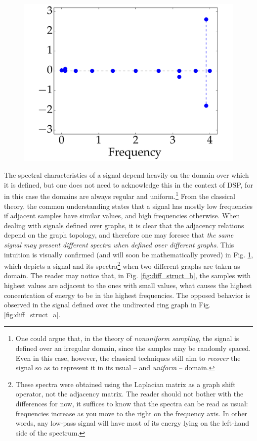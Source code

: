 \begin{figure}
\begin{minipage}[c]{0.25\linewidth}
{			\includegraphics[width=\linewidth]{Figures/ring_different_structure_02_spectrum_EN.pdf}
		}
	\end{minipage}%
	\floatsource
	\label{fig:diff_struct}%
	\vspace{-0.2cm}
\end{figure}

The spectral characteristics of a signal depend heavily on the domain over which it is defined, but one does not need to acknowledge this in the context of DSP, for in this case the domains are always regular and uniform.\footnote{One could argue that, in the theory of \emph{nonuniform sampling}, the signal is defined over an irregular domain, since the samples may be randomly spaced. Even in this case, however, the classical techniques still aim to \emph{recover} the signal so as to represent it in its usual -- and \emph{uniform} -- domain.
}
From the classical theory, the common understanding states that a signal has mostly low frequencies if adjacent samples have similar values, and high frequencies otherwise. When dealing with signals defined over graphs, it is clear that the adjacency relations depend on the graph topology, and therefore one may foresee that \emph{the same signal may present different spectra when defined over different graphs}. This intuition is visually confirmed (and will soon be mathematically proved) in Fig. \ref{fig:diff_struct}, which depicts a signal and its spectra\footnote{These spectra were obtained using the Laplacian matrix as a graph shift operator, not the adjacency matrix. The reader should not bother with the differences for now, it suffices to know that the spectra can be read as usual: frequencies increase as you move to the right on the frequency axis. In other words, any low-pass signal will have most of its energy lying on the left-hand side of the spectrum.} when two different graphs are taken as domain. The reader may notice that, in Fig. \ref{fig:diff_struct_b}, the samples with highest values are adjacent to the ones with small values, what causes the highest concentration of energy to be in the highest frequencies. The opposed behavior is observed in the signal defined over the undirected ring graph in Fig. \ref{fig:diff_struct_a}.

